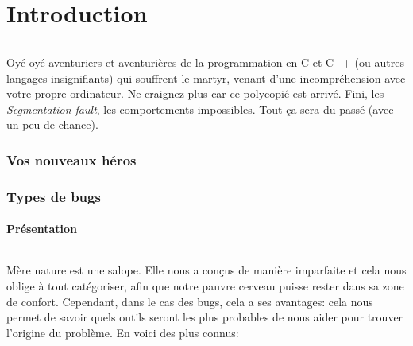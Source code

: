 \part{Introduction}

\paragraph{} Oyé oyé aventuriers et aventurières de la programmation en C et
C++ (ou autres langages insignifiants) qui souffrent le martyr, venant d'une
incompréhension avec votre propre ordinateur. Ne craignez plus car ce polycopié
est arrivé. Fini, les \textit{Segmentation fault}, les comportements
impossibles. Tout ça sera du passé (avec un peu de chance).

\section{Vos nouveaux héros}


\section{Types de bugs}

\subsection{Présentation}

\paragraph{} Mère nature est une salope. Elle nous a conçus de manière
imparfaite et cela nous oblige à tout catégoriser, afin que notre pauvre
cerveau puisse rester dans sa zone de confort. Cependant, dans le cas des bugs,
cela a ses avantages: cela nous permet de savoir quels outils seront les plus
probables de nous aider pour trouver l'origine du problème. En voici des plus
connus:

